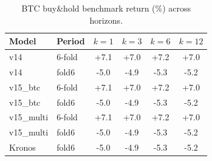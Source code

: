 \documentclass[11pt]{article}
\begin{document}
\begin{table}[h]\centering
\caption{BTC buy\&hold benchmark return (\%) across horizons.}
\label{tab:bench}
\begin{tabular}{ll cccc}
\toprule
Model & Period & $k{=}1$ & $k{=}3$ & $k{=}6$ & $k{=}12$ \\
\midrule
v14 & 6-fold & +7.1 & +7.0 & +7.2 & +7.0 \\
v14 & fold6 & -5.0 & -4.9 & -5.3 & -5.2 \\
v15\_btc & 6-fold & +7.1 & +7.0 & +7.2 & +7.0 \\
v15\_btc & fold6 & -5.0 & -4.9 & -5.3 & -5.2 \\
v15\_multi & 6-fold & +7.1 & +7.0 & +7.2 & +7.0 \\
v15\_multi & fold6 & -5.0 & -4.9 & -5.3 & -5.2 \\
Kronos & fold6 & -5.0 & -4.9 & -5.3 & -5.2 \\
\bottomrule\end{tabular}\end{table}
\end{document}
